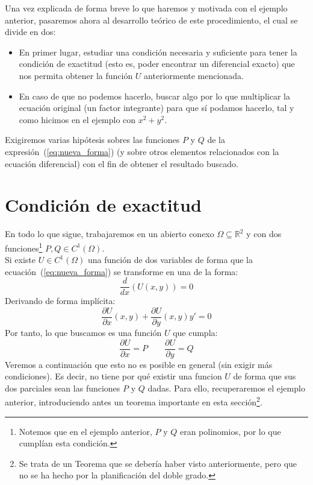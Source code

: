 Una vez explicada de forma breve lo que haremos y motivada con el ejemplo anterior, pasaremos ahora al desarrollo teórico de este procedimiento, el cual se divide en dos:
\begin{itemize}
    \item En primer lugar, estudiar una condición necesaria y suficiente para tener la condición de exactitud (esto es, poder encontrar un diferencial exacto) que nos permita obtener la función $U$ anteriormente mencionada.
    \item En caso de que no podemos hacerlo, buscar algo por lo que multiplicar la ecuación original (un factor integrante) para que sí podamos hacerlo, tal y como hicimos en el ejemplo con $x^2+y^2$.
\end{itemize}
Exigiremos varias hipótesis sobres las funciones $P$ y $Q$ de la expresión~(\ref{eq:nueva_forma}) (y sobre otros elementos relacionados con la ecuación diferencial) con el fin de obtener el resultado buscado.

\section{Condición de exactitud}
En todo lo que sigue, trabajaremos en un abierto conexo $\Omega\subseteq \mathbb{R}^2$ y con dos funciones\footnote{Notemos que en el ejemplo anterior, $P$ y $Q$ eran polinomios, por lo que cumplían esta condición.} $P,Q\in C^1(\Omega)$.\\

Si existe $U\in C^1(\Omega)$ una función de dos variables de forma que la ecuación~(\ref{eq:nueva_forma}) se transforme en una de la forma:
\begin{equation*}
    \dfrac{d}{dx}(U(x,y)) = 0
\end{equation*}
Derivando de forma implícita:
\begin{equation*}
    \dfrac{\partial U}{\partial x}(x,y) + \dfrac{\partial U}{\partial y}(x,y)y' = 0
\end{equation*}
Por tanto, lo que buscamos es una función $U$ que cumpla:
\begin{equation*}
    \dfrac{\partial U}{\partial x} = P \qquad \dfrac{\partial U}{\partial y} = Q
\end{equation*}
Veremos a continuación que esto no es posible en general (sin exigir más condiciones). Es decir, no tiene por qué existir una funcion $U$ de forma que sus dos parciales sean las funciones $P$ y $Q$ dadas. Para ello, recuperaremos el ejemplo anterior, introduciendo antes un teorema importante en esta sección\footnote{Se trata de un Teorema que se debería haber visto anteriormente, pero que no se ha hecho por la planificación del doble grado.}.

